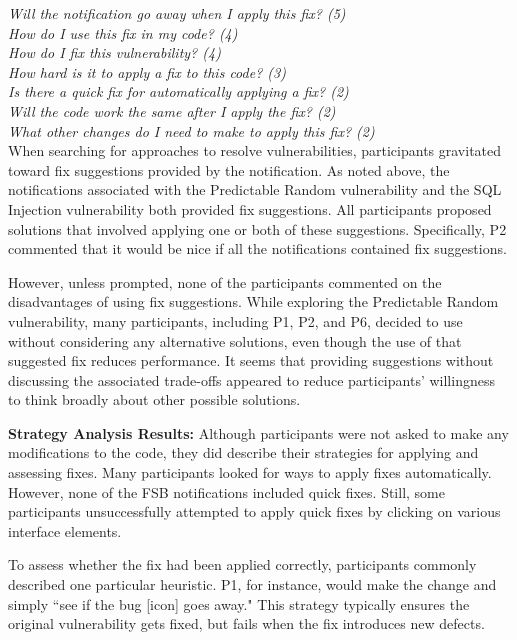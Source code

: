 \documentclass[10pt,journal,compsoc]{IEEEtran}
\begin{document}
\noindent\emph{Will the notification go away when I apply this fix? (5)} \\
\emph{How do I use this fix in my code? (4)} \\
\emph{How do I fix this vulnerability? (4)} \\
\emph{How hard is it to apply a fix to this code? (3)} \\
\emph{Is there a quick fix for automatically applying a fix? (2)} \\
\emph{Will the code work the same after I apply the fix? (2)} \\
\emph{What other changes do I need to make to apply this fix? (2)} 
\\

 
When searching for approaches to resolve vulnerabilities, participants gravitated toward fix suggestions provided by the notification.
As noted above, the notifications associated with the Predictable Random vulnerability and the SQL Injection vulnerability both provided fix suggestions.
All participants proposed solutions that involved applying one or both of these suggestions. 
Specifically, P2 commented that it would be nice if all the notifications contained fix suggestions.

However, unless prompted, none of the participants commented on the disadvantages of using fix suggestions.
While exploring the Predictable Random vulnerability, many participants, including P1, P2, and P6, decided to use  without considering any alternative solutions, even though the use of that suggested fix reduces performance.
It seems that providing suggestions without discussing the associated trade-offs appeared to reduce participants' willingness to think broadly about other possible solutions. 


\textbf{Strategy Analysis Results:}
Although participants were not asked to make any modifications to the code, they did describe their strategies for applying and assessing fixes.
Many participants looked for ways to apply fixes automatically.
However, none of the FSB notifications included quick fixes.
Still, some participants unsuccessfully attempted to apply quick fixes by clicking on various interface elements.

To assess whether the fix had been applied correctly, participants commonly described one particular heuristic. P1, for instance, would make the change and simply ``see if the bug [icon] goes away." 
This strategy typically ensures the original vulnerability gets fixed, but fails when the fix introduces new defects.
\end{document}
